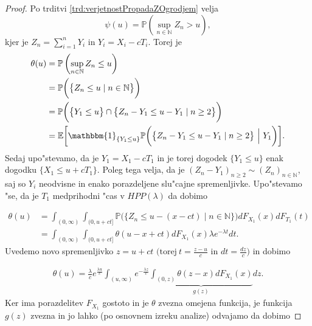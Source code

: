 \documentclass[12pt, a4paper, reqno]{amsart}
\theoremstyle{definition}
\theoremstyle{plain}
\newcommand{\N}{\mathbb{N}}
\newcommand{\E}{\mathbb{E}}
\newcommand{\Prob}{\mathbb{P}}
\newcommand{\1}{\mathds{1}}
\begin{document}
            \begin{proof}
                Po trditvi \ref{trd:verjetnostPropadaZOgrodjem} velja
                \begin{equation*}
                    \psi(u) = \Prob\left(\sup_{n\in\N}Z_n > u\right),
                \end{equation*}
                kjer je $Z_n = \sum_{i=1}^nY_i$ in $Y_i = X_i - cT_i$. Torej je
                \begin{align*}
                    \theta(u) &= \Prob\left(\sup_{n\in\N}Z_n \leq u\right) \\
                              &= \Prob\biggl(\bigl\{Z_n \leq u\mid n\in\N\bigr\}\biggr) \\
                              &= \Prob\biggl(\bigl\{Y_1 \leq u\bigr\}\cap \bigl\{Z_n - Y_1 \leq u - Y_1\mid n\geq2\bigr\}\biggr) \\
                              &= \E\biggl[\mathbbm{1}_{\{Y_1\leq u\}}\Prob\biggl(\bigl\{Z_n - Y_1 \leq u - Y_1\mid n\geq2\bigr\} \ \Big| \ Y_1\biggr)\biggr].
                \end{align*}
                Sedaj upo"stevamo, da je $Y_1 = X_1 - cT_1$ in je torej dogodek $\{Y_1 \leq u\}$ 
                enak dogodku $\{X_1 \leq u + cT_1\}$. Poleg tega velja, da je 
                $(Z_n - Y_1)_{n\geq2} \sim (Z_n)_{n\in\N}$, saj so $Y_i$ neodvisne in enako porazdeljene
                slu"cajne spremenljivke.
                Upo"stevamo "se, da je  $T_1$ medprihodni "cas v $HPP(\lambda)$ da dobimo

                \begin{align*}
                        \theta(u)   &= \int_{(0, \infty)}\int_{(0, u + ct]}\Prob\biggl(\bigl\{Z_n \leq u - (x - ct)\mid n\in\N\bigr\}\biggr)dF_{X_1}(x)dF_{T_1}(t) \\
                                    &= \int_{(0, \infty)}\int_{(0, u + ct]}\theta(u - x + ct)dF_{X_1}(x)\lambda e^{-\lambda t}dt.
                \end{align*}
                Uvedemo novo spremenljivko $z = u + ct$ $\bigl( \text{torej} \ t = \tfrac{z - u}{c}$ in $dt = \tfrac{dz}{c} \bigr)$ 
                in dobimo

                \begin{align*}
                            \theta(u) = \frac{\lambda}{c}e^{\frac{\lambda u}{c}}\int_{(u, \infty)}e^{-\frac{\lambda z}{c}}\underbrace{\int_{(0, z)}\theta(z - x)dF_{X_1}(x)}_{g(z)}dz.
                \end{align*}
                Ker ima porazdelitev $F_{X_1}$ gostoto in je $\theta$ zvezna omejena funkcija,
                je funkcija $g(z)$ zvezna in jo lahko (po osnovnem izreku analize)
                odvajamo da dobimo


\end{proof}
\end{document}
